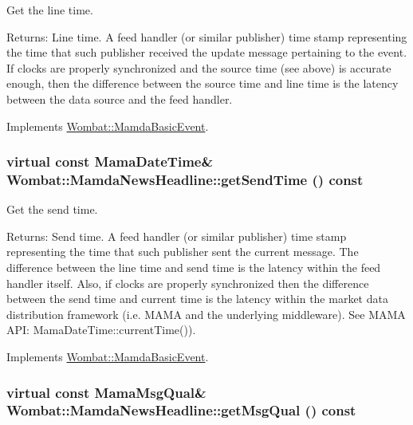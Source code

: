 Get the line time. 

\begin{Desc}
\item[Returns:]Line time. A feed handler (or similar publisher) time stamp representing the time that such publisher received the update message pertaining to the event. If clocks are properly synchronized and the source time (see above) is accurate enough, then the difference between the source time and line time is the latency between the data source and the feed handler. \end{Desc}


Implements \hyperlink{classWombat_1_1MamdaBasicEvent_3fcc26fa1a6446bcec12b11ac74ed26d}{Wombat::Mamda\-Basic\-Event}.\hypertarget{classWombat_1_1MamdaNewsHeadline_aaae18e2229981540e00408cad367103}{
\subsubsection[getSendTime]{\setlength{\rightskip}{0pt plus 5cm}virtual const Mama\-Date\-Time\& Wombat::Mamda\-News\-Headline::get\-Send\-Time () const}}
\label{classWombat_1_1MamdaNewsHeadline_aaae18e2229981540e00408cad367103}


Get the send time. 

\begin{Desc}
\item[Returns:]Send time. A feed handler (or similar publisher) time stamp representing the time that such publisher sent the current message. The difference between the line time and send time is the latency within the feed handler itself. Also, if clocks are properly synchronized then the difference between the send time and current time is the latency within the market data distribution framework (i.e. MAMA and the underlying middleware). See MAMA API: Mama\-Date\-Time::current\-Time()). \end{Desc}


Implements \hyperlink{classWombat_1_1MamdaBasicEvent_b0602a83bec20cd8b341ec866ff3bffa}{Wombat::Mamda\-Basic\-Event}.\hypertarget{classWombat_1_1MamdaNewsHeadline_cce176e4bbbebb5e0da87beee835de16}{
\subsubsection[getMsgQual]{\setlength{\rightskip}{0pt plus 5cm}virtual const Mama\-Msg\-Qual\& Wombat::Mamda\-News\-Headline::get\-Msg\-Qual () const}}
\label{classWombat_1_1MamdaNewsHeadline_cce176e4bbbebb5e0da87beee835de16}


